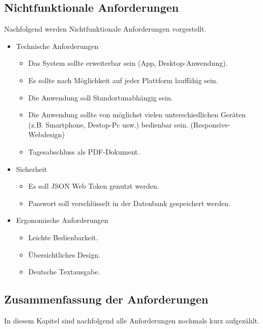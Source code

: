 \subsection{Nichtfunktionale Anforderungen}\label{nichtfunktionale_Anforderungen}

Nachfolgend werden Nichtfunktionale Anforderungen vorgestellt. 
\\
\begin{itemize}
		\itemsep0pt
	\item Technische Anforderungen
		\begin{itemize}
		\item Das System sollte erweiterbar sein (App, Desktop-Anwendung).
		\item Es sollte nach Möglichkeit auf jeder Plattform lauffähig sein.
		\item Die Anwendung soll Standortunabhängig sein.
		\item Die Anwendung sollte von möglichst vielen unterschiedlichen Geräten (z.B. Smartphone, Destop-Pc usw.) bedienbar sein. (Responsive-Webdesign)
		\item Tagesabschluss als PDF-Dokument.
		\end{itemize}
	\item Sicherheit\textit{}
		\begin{itemize}
		\item Es soll JSON Web Token genutzt werden.
		\item Passwort soll verschlüsselt in der Datenbank gespeichert werden.
		\end{itemize}
	\item Ergonomische Anforderungen
	\begin{itemize}
		\item Leichte Bedienbarkeit.
		\item Übersichtliches Design.
		\item Deutsche Textausgabe.
	\end{itemize}
\end{itemize}


\subsection{Zusammenfassung der Anforderungen}\label{zusa}
In diesem Kapitel sind nachfolgend alle Anforderungen nochmals kurz aufgezählt.
\\

